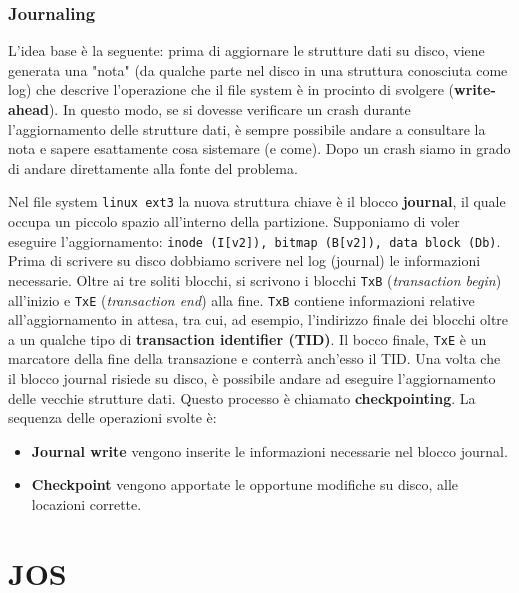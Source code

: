 \documentclass[12pt, letterpaper]{article}
\begin{document}
			\subsubsection{Journaling}
				L'idea base è la seguente: prima di aggiornare le strutture dati su disco, viene generata una "nota" (da qualche parte nel disco in una struttura conosciuta come log) che descrive l'operazione che il file system è in procinto di svolgere (\textbf{write-ahead}). In questo modo, se si dovesse verificare un crash durante l'aggiornamento delle strutture dati, è sempre possibile andare a consultare la nota e sapere esattamente cosa sistemare (e come). Dopo un crash siamo in grado di andare direttamente alla fonte del problema.
				
				Nel file system \texttt{linux ext3} la nuova struttura chiave è il blocco \textbf{journal}, il quale occupa un piccolo spazio all'interno della partizione. Supponiamo di voler eseguire l'aggiornamento: \texttt{inode (I[v2]), bitmap (B[v2]), data block (Db)}. Prima di scrivere su disco dobbiamo scrivere nel log (journal) le informazioni necessarie. Oltre ai tre soliti blocchi, si scrivono i blocchi \texttt{TxB} (\textit{transaction begin}) all'inizio e \texttt{TxE} (\textit{transaction end}) alla fine. \texttt{TxB} contiene informazioni relative all'aggiornamento in attesa, tra cui, ad esempio, l'indirizzo finale dei blocchi oltre a un qualche tipo di \textbf{transaction identifier (TID)}. Il bocco finale, \texttt{TxE} è un marcatore della fine della transazione e conterrà anch'esso il TID. Una volta che il blocco journal risiede su disco, è possibile andare ad eseguire l'aggiornamento delle vecchie strutture dati. Questo processo è chiamato \textbf{checkpointing}. La sequenza delle operazioni svolte è:
				\begin{itemize}
					\item \textbf{Journal write} vengono inserite le informazioni necessarie nel blocco journal.
					\item \textbf{Checkpoint} vengono apportate le opportune modifiche su disco, alle locazioni corrette. 
				\end{itemize}
															
				
\newpage
	\section{JOS}
\end{document}
